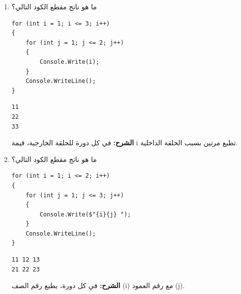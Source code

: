 \documentclass[14pt]{extarticle}
\begin{document}
\begin{enumerate}[itemsep=2em]
    \clearpage
    \item
    ما هو ناتج مقطع الكود التالي؟
    \begin{boxCode}
    \begin{english}
    \begin{verbatim}
for (int i = 1; i <= 3; i++)
{
    for (int j = 1; j <= 2; j++)
    {
        Console.Write(i);
    }
    Console.WriteLine();
}
    \end{verbatim}
    \end{english}
    \end{boxCode}
    \ifwithsols
    \begin{boxSolution}
    \begin{english}
    \begin{boxCode}
\begin{verbatim}
11
22
33
    \end{verbatim}
\end{boxCode}
    \end{english}
    \textbf{الشرح:} في كل دورة للحلقة الخارجية، قيمة \textenglish{i} تطبع مرتين بسبب الحلقة الداخلية.
    \end{boxSolution}
    \clearpage
    \fi

        \item
    ما هو ناتج مقطع الكود التالي؟
    \begin{boxCode}
    \begin{english}
    \begin{verbatim}
for (int i = 1; i <= 2; i++)
{
    for (int j = 1; j <= 3; j++)
    {
        Console.Write($"{i}{j} ");
    }
    Console.WriteLine();
}
    \end{verbatim}
    \end{english}
    \end{boxCode}
    \ifwithsols
    \begin{boxSolution}
    \begin{english}
    \begin{boxCode}
\begin{verbatim}
11 12 13
21 22 23
    \end{verbatim}
\end{boxCode}
    \end{english}
    \textbf{الشرح:} في كل دورة، يطبع رقم الصف (\textenglish{i}) مع رقم العمود (\textenglish{j}).
    \end{boxSolution}
    \fi


\end{enumerate}
\end{document}
